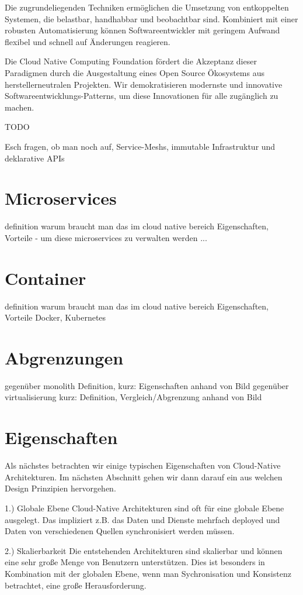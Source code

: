 Die zugrundeliegenden Techniken ermöglichen die Umsetzung von entkoppelten Systemen, die belastbar, handhabbar und beobachtbar sind. Kombiniert mit einer robusten Automatisierung können Softwareentwickler mit geringem Aufwand flexibel und schnell auf Änderungen reagieren.

Die Cloud Native Computing Foundation fördert die Akzeptanz dieser Paradigmen durch die Ausgestaltung eines Open Source Ökosystems aus herstellerneutralen Projekten. Wir demokratisieren modernste und innovative Softwareentwicklungs-Patterns, um diese Innovationen für alle zugänglich zu machen.

TODO


Esch fragen, ob man noch auf, Service-Meshs, immutable Infrastruktur und deklarative APIs


\section{Microservices}
definition
warum braucht man das im cloud native bereich
Eigenschaften, Vorteile
- um diese microservices zu verwalten werden ...
\section{Container}
definition
warum braucht man das im cloud native bereich
Eigenschaften, Vorteile
 Docker, Kubernetes
\section{Abgrenzungen}
gegenüber monolith
Definition, kurz: Eigenschaften anhand von Bild
gegenüber virtualisierung
kurz: Definition, Vergleich/Abgrenzung anhand von Bild
\section{Eigenschaften}
Als nächstes betrachten wir einige typischen Eigenschaften von Cloud-Native Architekturen. Im nächsten Abschnitt gehen wir dann darauf ein aus welchen Design Prinzipien hervorgehen.

1.) Globale Ebene
Cloud-Native Architekturen sind oft für eine globale Ebene ausgelegt. Das impliziert z.B. das Daten und Dienste mehrfach deployed und Daten von verschiedenen Quellen synchronisiert werden müssen.

2.) Skalierbarkeit
Die entstehenden Architekturen sind skalierbar und können eine sehr große Menge von Benutzern unterstützen. Dies ist besonders in Kombination mit der globalen Ebene, wenn man Sychronisation und Konsistenz betrachtet, eine große Herausforderung.

